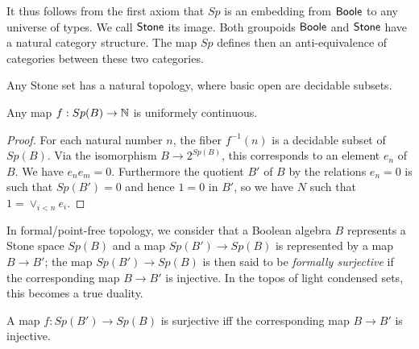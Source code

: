 %

It thus follows from the first axiom that $Sp$ is an embedding from $\mathsf{Boole}$ to any universe of types. We call
$\mathsf{Stone}$ its image. Both groupoids $\mathsf{Boole}$ and $\mathsf{Stone}$ have a natural category structure.
The map $Sp$ defines then an anti-equivalence of categories between these two categories.


Any Stone set has a natural topology, where basic open are decidable subsets.

\medskip

\begin{proposition}
Any map $f: Sp(B)\rightarrow\mathbb{N}$ is uniformely continuous.
\end{proposition}  

\begin{proof}
  For each natural number $n$, the fiber $f^{-1}(n)$ is a decidable
  subset of $Sp(B)$. Via the isomorphism $B\rightarrow 2^{Sp(B)}$, this corresponds to an element $e_n$ of $B$. We have
  $e_ne_m = 0$. Furthermore the quotient $B'$ of $B$ by the relations $e_n = 0$ is such that $Sp(B') = 0$ and hence
  $1 = 0$ in $B'$, so we have $N$ such that $1 = \vee_{i<n}e_i$.
\end{proof}

\medskip

In formal/point-free topology, we consider that a Boolean algebra $B$ represents a Stone space $Sp(B)$ and a map
$Sp(B') \to Sp(B)$ is represented by a map $B\rightarrow B'$; the map $Sp(B')\to Sp(B)$ is then said to be
{\em formally surjective} if the corresponding map $B\to B'$ is injective. In the topos of light condensed sets,
this becomes a true duality.

\begin{axiom}
  A map $f:Sp(B')\to Sp(B)$ is surjective iff the corresponding map $B \to B'$ is injective.
\end{axiom} 

